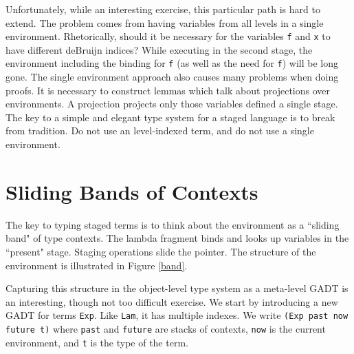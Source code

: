 \documentclass{sigplanconf}
\begin{document}
Unfortunately, while an interesting exercise, this particular path is hard to
extend. The problem comes from having variables from all levels in a
single environment. Rhetorically, should it be necessary for the variables
{\tt f} and {\tt x} to have different deBruijn indices? While executing in the
second stage, the environment including the binding for {\tt f} (as well as
the need for {\tt f}) will be long gone. The single environment approach also
causes many problems when doing proofs. It is necessary to construct lemmas
which talk about projections over environments. A projection projects only those
variables defined a single stage. The key to a simple and elegant type system
for a staged language is to break from tradition. Do not use an level-indexed
term, and do not use a single environment.

\section{Sliding Bands of Contexts} \label{final}

The key to typing staged terms is to think about
the environment as a ``sliding band" of type contexts. The lambda
fragment binds and looks up variables in the ``present" stage. Staging operations
slide the pointer. The structure of the environment is illustrated in
Figure \ref{band}. 

Capturing this structure in the object-level type system as a meta-level
GADT is an interesting, though not too difficult exercise. We start
by introducing a new GADT for terms {\tt Exp}. Like {\tt Lam}, it has
multiple indexes. We write
{\tt (Exp past now future t)} where {\tt past} and {\tt future} are
stacks of contexts, {\tt now} is the current environment, and {\tt t}
is the type of the term.
\end{document}
